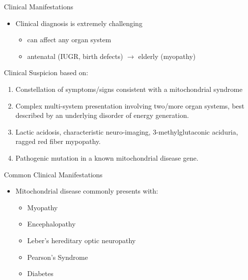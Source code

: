 \documentclass[presentation, smaller]{beamer}
\begin{document}
\begin{frame}[label={sec:org0dc093a}]{Clinical Manifestations}
\begin{itemize}
\item Clinical diagnosis is extremely challenging
\begin{itemize}
\item can affect any organ system
\item antenatal (IUGR, birth defects) \(\to\) elderly (myopathy)
\end{itemize}
\end{itemize}

\begin{block}{Clinical Suspicion based on:}
\begin{enumerate}
\item Constellation of symptoms/signs consistent with a mitochondrial syndrome
\item Complex multi-system presentation involving two/more organ systems,
best described by an underlying disorder of energy generation.
\item Lactic acidosis, characteristic neuro-imaging, 3-methylglutaconic
aciduria, ragged red fiber mypopathy.
\item Pathogenic mutation in a known mitochondrial disease gene.
\end{enumerate}
\end{block}
\end{frame}

\begin{frame}[label={sec:org5c13562}]{Common Clinical Manifestations}
\begin{itemize}
\item Mitochondrial disease commonly presents with:
\begin{itemize}
\item Myopathy
\item Encephalopathy
\item Leber’s hereditary optic neuropathy
\item Pearson's Syndrome
\item Diabetes
\end{itemize}
\end{itemize}
\end{frame}
\end{document}
